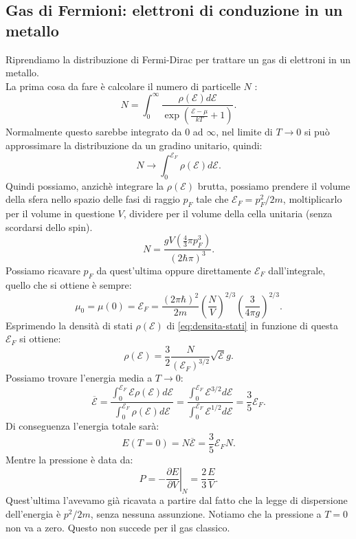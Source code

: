 \subsection{Gas di Fermioni: elettroni di conduzione in un metallo}%
Riprendiamo la distribuzione di Fermi-Dirac per trattare un gas di elettroni in un metallo.\\
La prima cosa da fare è calcolare il numero di particelle $N$ :
\[
	N = \int_{0}^{\infty} \frac{\rho ( \mathcal{E} ) d\mathcal{E} }{\exp\left( \frac{\mathcal{E} -\mu }{kT}+1 \right) }
.\] 
Normalmente questo sarebbe integrato da $0$ ad $\infty$, nel limite di $T \to 0$ si può approssimare la distribuzione da un gradino unitario, quindi:
\[
	N \to \int_{0}^{\mathcal{E} _{F}}  \rho ( \mathcal{E} ) d\mathcal{E}  
.\] 
Quindi possiamo, anzichè integrare la $\rho ( \mathcal{E} ) $ brutta, possiamo prendere il volume della sfera nello spazio delle fasi di raggio $p _{F}$ tale che $\mathcal{E} _{F} = p_{F}^2 /2m$, moltiplicarlo per il volume in questione $V$, dividere per il volume della cella unitaria (senza scordarsi dello spin).
\[
	N = \frac{g V \left( \frac{4}{3} \pi p_{F}^3 \right) }{\left( 2\hbar \pi \right) ^3} 
.\] 
Possiamo ricavare $p_{F}$ da quest'ultima oppure direttamente $\mathcal{E} _{F}$ dall'integrale, quello che si ottiene è sempre:
\[
	\mu _{0} = \mu ( 0) = \mathcal{E} _{F} = \frac{\left( 2\pi \hbar  \right) ^2}{2m} \left( \frac{N}{V} \right) ^{2 /3} \left( \frac{3}{4\pi g} \right) ^{2 /3}
.\]
Esprimendo la densità di stati $\rho ( \mathcal{E} ) $ di \ref{eq:densita-stati} in funzione di questa $\mathcal{E} _{F}$ si ottiene:
\[
	\rho ( \mathcal{E} ) = \frac{3}{2}\frac{N}{\left( \mathcal{E} _{F} \right)^{3 / 2}}\sqrt{\mathcal{E}}  g  \label{eq:densita-stati-con-E-fermi}
.\] 
Possiamo trovare l'energia media a $T\to 0$:
\[
	\overline{\mathcal{E} } = \frac{\int_{0}^{\mathcal{E} _{F}} \mathcal{E} \rho ( \mathcal{E} ) d\mathcal{E} }{\int_{0}^{\mathcal{E} _{F}} \rho ( \mathcal{E} ) d\mathcal{E}  }=
	\frac{\int_{0}^{\mathcal{E} _{F}} \mathcal{E} ^{3 /2}d\mathcal{E}  }{\int_{0}^{\mathcal{E} _{F}} \mathcal{E} ^{ 1/ 2}d \mathcal{E}  } = 
	\frac{3}{5} \mathcal{E} _{F}	
.\] 
Di conseguenza l'energia totale sarà:
\[
	E( T=0)  = N \overline{\mathcal{E} } = \frac{3}{5} \mathcal{E}_{F} N
.\] 
Mentre la pressione è data da:
\[
	P = - \left.\frac{\partial E}{\partial V} \right|_{N} = \frac{2}{3}\frac{E}{V}
.\] 
Quest'ultima l'avevamo già ricavata a partire dal fatto che la legge di dispersione dell'energia è $p^2/2m$, senza nessuna assunzione. Notiamo che la pressione a $T = 0$ non va a zero. Questo non succede per il gas classico.\\
